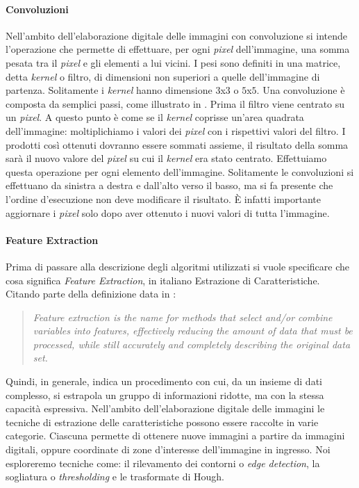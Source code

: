 \paragraph{Convoluzioni} \label{conv_para}
Nell'ambito dell'elaborazione digitale delle immagini con convoluzione si intende l'operazione che permette di effettuare, per ogni \textit{pixel} dell'immagine, una somma pesata tra il \textit{pixel} e gli elementi a lui vicini.
I pesi sono definiti in una matrice, detta \textit{kernel} o filtro, di dimensioni non superiori a quelle dell'immagine di partenza.
Solitamente i \textit{kernel} hanno dimensione $3$x$3$ o $5$x$5$.%
Una convoluzione è composta da semplici passi, come illustrato in \cite{kernel-conv}.
Prima il filtro viene centrato su un \textit{pixel}.
A questo punto è come se il \textit{kernel} coprisse un'area quadrata dell'immagine: moltiplichiamo i valori dei \textit{pixel} con i rispettivi valori del filtro.
I prodotti così ottenuti dovranno essere sommati assieme, il risultato della somma sarà il nuovo valore del \textit{pixel} su cui il \textit{kernel} era stato centrato.
Effettuiamo questa operazione per ogni elemento dell'immagine.
Solitamente le convoluzioni si effettuano da sinistra a destra e dall'alto verso il basso, ma si fa presente che l'ordine d'esecuzione non deve modificare il risultato.
È infatti importante aggiornare i \textit{pixel} solo dopo aver ottenuto i nuovi valori di tutta l'immagine.

\paragraph{Feature Extraction}
Prima di passare alla descrizione degli algoritmi utilizzati si vuole specificare che cosa significa \textit{Feature Extraction}, in italiano Estrazione di Caratteristiche.
Citando parte della definizione data in \cite{deepai-feat-ext} :
\begin{quote}
  \textit{Feature extraction is the name for methods that select and/or combine variables into features, effectively reducing the amount of data that must be processed, while still accurately and completely describing the original data set.}
\end{quote}
Quindi, in generale, indica un procedimento con cui, da un insieme di dati complesso, si estrapola un gruppo di informazioni ridotte, ma con la stessa capacità espressiva.
Nell'ambito dell'elaborazione digitale delle immagini le tecniche di estrazione delle caratteristiche possono essere raccolte in varie categorie.
Ciascuna permette di ottenere nuove immagini a partire da immagini digitali, oppure coordinate di zone d'interesse dell'immagine in ingresso.
Noi esploreremo tecniche come: il rilevamento dei contorni o \textit{edge detection}, la sogliatura o \textit{thresholding} e le trasformate di Hough.

